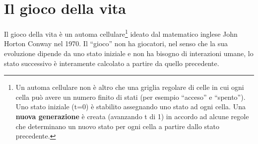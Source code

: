 \section{Il gioco della vita}
\label{sec:the_game_of_life}
Il gioco della vita \`e un automa cellulare\footnote{Un automa cellulare non \`e altro che una griglia regolare di celle in cui ogni cella pu\`o avere un numero finito di stati (per esempio ``acceso'' e ``spento''). Uno stato iniziale (t=0) \`e stabilito assegnando uno stato ad ogni cella. Una \textbf{nuova generazione} \`e creata (avanzando t di 1) in accordo ad alcune regole che determinano un nuovo stato per ogni cella a partire dallo stato precedente.} ideato dal matematico inglese John Horton Conway nel 1970. Il ``gioco'' non ha giocatori, nel senso che la sua evoluzione dipende da uno stato iniziale e non ha bisogno di interazioni umane, lo stato successivo \`e interamente calcolato a partire da quello precedente.

